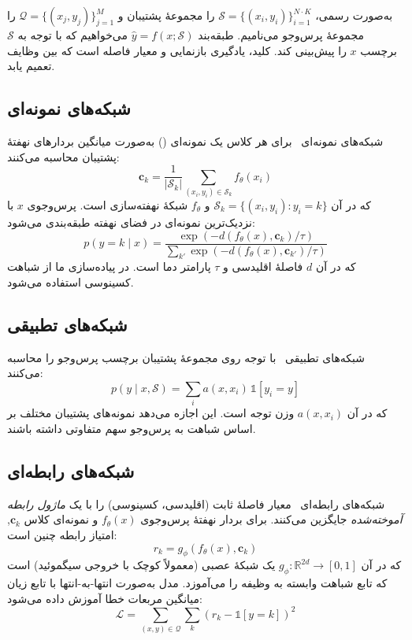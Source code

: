 به‌صورت رسمی، $\mathcal{S} = \{(x_i, y_i)\}_{i=1}^{N \cdot K}$ را مجموعۀ پشتیبان و $\mathcal{Q} = \{(x_j, y_j)\}_{j=1}^{M}$ را مجموعۀ پرس‌وجو می‌نامیم. طبقه‌بند $\hat{y} = f(x; \mathcal{S})$ می‌خواهیم که با توجه به $\mathcal{S}$ برچسب $x$ را پیش‌بینی کند. کلید، یادگیری بازنمایی و معیار فاصله است که بین وظایف تعمیم یابد.

\subsection{شبکه‌های نمونه‌ای}

شبکه‌های نمونه‌ای~\cite{snell2017prototypical} برای هر کلاس یک نمونه‌ای () به‌صورت میانگین بردارهای نهفتۀ پشتیبان محاسبه می‌کنند:
\begin{equation}
\mathbf{c}_k = \frac{1}{|\mathcal{S}_k|} \sum_{(x_i, y_i) \in \mathcal{S}_k} f_\theta(x_i)
\end{equation}
که در آن $\mathcal{S}_k = \{(x_i, y_i) : y_i = k\}$ و $f_\theta$ شبکۀ نهفته‌سازی است. پرس‌وجوی $x$ با نزدیک‌ترین نمونه‌ای در فضای نهفته طبقه‌بندی می‌شود:
\begin{equation}
p(y = k \mid x) = \frac{\exp(-d(f_\theta(x), \mathbf{c}_k) / \tau)}{\sum_{k'} \exp(-d(f_\theta(x), \mathbf{c}_{k'}) / \tau)}
\end{equation}
که در آن $d$ فاصلۀ اقلیدسی و $\tau$ پارامتر دما است. در پیاده‌سازی ما از شباهت کسینوسی استفاده می‌شود.

\subsection{شبکه‌های تطبیقی}

شبکه‌های تطبیقی~\cite{vinyals2016matching} با توجه روی مجموعۀ پشتیبان برچسب پرس‌وجو را محاسبه می‌کنند:
\begin{equation}
p(y \mid x, \mathcal{S}) = \sum_{i} a(x, x_i) \, \mathbb{1}[y_i = y]
\end{equation}
که در آن $a(x, x_i)$ وزن توجه است. این اجازه می‌دهد نمونه‌های پشتیبان مختلف بر اساس شباهت به پرس‌وجو سهم متفاوتی داشته باشند.

\subsection{شبکه‌های رابطه‌ای}

شبکه‌های رابطه‌ای~\cite{sung2018learning} معیار فاصلۀ ثابت (اقلیدسی، کسینوسی) را با یک \emph{ماژول رابطه آموخته‌شده} جایگزین می‌کنند. برای بردار نهفتۀ پرس‌وجوی $f_\theta(x)$ و نمونه‌ای کلاس $\mathbf{c}_k$, امتیاز رابطه چنین است:
\begin{equation}
r_k = g_\phi(f_\theta(x), \mathbf{c}_k)
\end{equation}
که در آن $g_\phi: \mathbb{R}^{2d} \to [0,1]$ یک شبکۀ عصبی (معمولاً  کوچک با خروجی سیگموئید) است که تابع شباهت وابسته به وظیفه را می‌آموزد. مدل به‌صورت انتها-به-انتها با تابع زیان میانگین مربعات خطا آموزش داده می‌شود:
\begin{equation}
\mathcal{L} = \sum_{(x,y) \in \mathcal{Q}} \sum_k (r_k - \mathbb{1}[y=k])^2
\end{equation}

